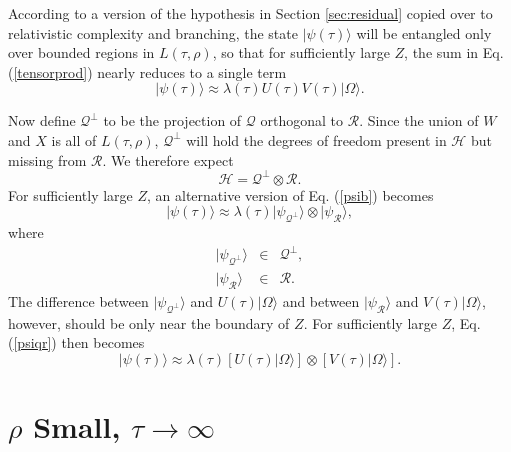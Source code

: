\documentclass[12pt,amsmath,amssymb,onecolumn]{revtex4-2}
\begin{document}
According to a version of the hypothesis in Section \ref{sec:residual}
copied over to relativistic complexity and branching, the state
$|\psi( \tau) \rangle $ will be entangled
only over bounded regions in $L( \tau, \rho)$,
so that for sufficiently large $Z$, 
the sum in Eq. (\ref{tensorprod}) nearly reduces to a single term
\begin{equation}
  \label{psib0}
  |\psi(\tau) \rangle   \approx \lambda( \tau) U(\tau) V(\tau) |\Omega \rangle .
\end{equation}

Now define $\mathcal{Q}^\perp$ to be the projection of $\mathcal{Q}$ orthogonal
to $\mathcal{R}$. Since the union of $W$ and $X$ is all of $L( \tau, \rho)$,
$\mathcal{Q}^\perp$ will hold
the degrees of freedom present in $\mathcal{H}$ but missing from $\mathcal{R}$.
We therefore expect
\begin{equation}
  \label{hqr}
  \mathcal{H} = \mathcal{Q}^\perp \otimes \mathcal{R}.
\end{equation}
For sufficiently large $Z$, an alternative version of Eq. (\ref{psib})
becomes
\begin{equation}
  \label{psiqr}
  |\psi(\tau) \rangle  \approx \lambda( \tau) |\psi_{\mathcal{Q}^\perp} \rangle  \otimes |\psi_{\mathcal{R}} \rangle ,
\end{equation}
where
\begin{subequations}
  \begin{eqnarray}
    \label{psiqperp}
      |\psi_{\mathcal{Q}^\perp} \rangle  &\in& \mathcal{Q}^\perp, \\
    \label{psir}
    |\psi_{\mathcal{R}} \rangle  &\in& \mathcal{R}.
  \end{eqnarray}
\end{subequations}
The difference between $|\psi_{\mathcal{Q}^\perp} \rangle $ and $U(\tau) |\Omega \rangle $
and between $|\psi_{\mathcal{R}} \rangle $ and $V(\tau) |\Omega \rangle $, however,
should be only near the boundary of $Z$.
For sufficiently large $Z$, Eq. (\ref{psiqr}) then becomes
\begin{equation}
  \label{psib}
  |\psi(\tau) \rangle  \approx \lambda( \tau) [U(\tau) |\Omega \rangle ] \otimes [V(\tau) |\Omega \rangle ].
\end{equation}




\section{\label{sec:rhozero}$\rho$ Small, $\tau \rightarrow \infty$}
\end{document}
